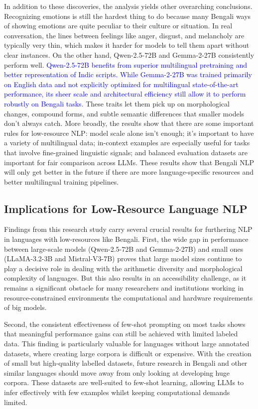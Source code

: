 \documentclass[10pt,letterpaper]{article}
\newcommand{\rev}[1]{\textcolor{blue}{#1}}
\begin{document}
In addition to these discoveries, the analysis yields other overarching conclusions.  Recognizing emotions is still the hardest thing to do because many Bengali ways of showing emotions are quite peculiar to their culture or situation.  In real conversation, the lines between feelings like anger, disgust, and melancholy are typically very thin, which makes it harder for models to tell them apart without clear instances.  On the other hand, Qwen-2.5-72B and Gemma-2-27B consistently perform well. \rev{Qwen-2.5-72B benefits from superior multilingual pretraining and better representation of Indic scripts. While Gemma-2-27B was trained primarily on English data and not explicitly optimized for multilingual state-of-the-art performance, its sheer scale and architectural efficiency still allow it to perform robustly on Bengali tasks.}  These traits let them pick up on morphological changes, compound forms, and subtle semantic differences that smaller models don't always catch.  More broadly, the results show that there are some important rules for low-resource NLP: model scale alone isn't enough; it's important to have a variety of multilingual data; in-context examples are especially useful for tasks that involve fine-grained linguistic signals; and balanced evaluation datasets are important for fair comparison across LLMs.  These results show that Bengali NLP will only get better in the future if there are more language-specific resources and better multilingual training pipelines.


\subsection*{Implications for Low-Resource Language NLP}

Findings from this research study carry several crucial results for furthering NLP in languages with low-resources like Bengali. First, the wide gap in performance between large-scale models (Qwen-2.5-72B and Gemma-2-27B) and small ones (LLaMA-3.2-3B and Mistral-V3-7B) proves that large model sizes continue to play a decisive role in dealing with the arithmetic diversity and morphological complexity of languages. But this also results in an accessibility challenge, as it remains a significant obstacle for many researchers and institutions working in resource-constrained environments the computational and hardware requirements of big models.

Second, the consistent effectiveness of few-shot prompting on most tasks shows that meaningful performance gains can still be achieved with limited labeled data. This finding is particularly valuable for languages without large annotated datasets, where creating large corpora is difficult or expensive. With the creation of small but high-quality labelled datasets, future research in Bengali and other similar languages should move away from only looking at developing huge corpora. These datasets are well-suited to few-shot learning, allowing LLMs to infer effectively with few examples whilst keeping computational demands limited.
\end{document}

